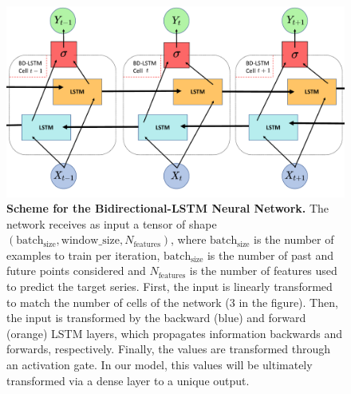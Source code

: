 \begin{figure}[H]
    \centering
    \includegraphics[width=\textwidth]{Figures/BD_LSTM_scheme.pdf}
    \caption[Scheme for the Bidirectional-LSTM Neural Network]{\textbf{Scheme
            for the Bidirectional-LSTM Neural Network.} The network
        receives as input a tensor of shape $(\textrm{batch}_\textrm{size},
            \textrm{window}\_\textrm{size}, N_{\textrm{features}})$, where
        $\textrm{batch}_\textrm{size}$ is the number of examples to train per
        iteration, $\textrm{batch}_\textrm{size}$ is the number of past and
        future
        points considered and $N_{\textrm{features}}$ is the number of features
        used to
        predict the target series. First, the input is linearly transformed to
        match
        the number of cells of the network (3 in the figure). Then, the input
        is
        transformed by the backward (blue) and forward (orange) LSTM layers,
        which
        propagates information backwards and forwards, respectively. Finally,
        the
        values are transformed through an activation gate. In our model, this
        values
        will be ultimately transformed via a dense layer to a unique output.}
    \label{fig:BD_LSTM_scheme}
\end{figure}